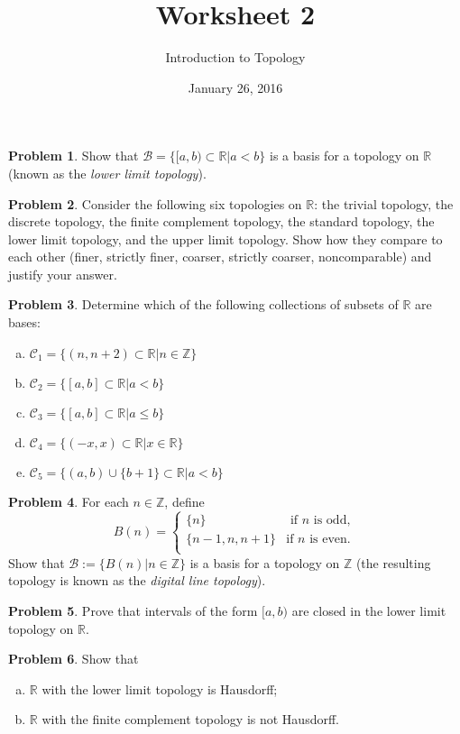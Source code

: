 \documentclass{amsart}
\newcommand{\+}[1]{\ensuremath{\mathbf{#1}}}
\newcommand{\Z}{{\mathbb Z}}
\newcommand{\R}{{\mathbb R}}
\theoremstyle{definition}
\newtheorem{prob}{Problem}
\begin{document}
\title{Worksheet 2}
\date{January 26, 2016}
\author{Introduction to Topology}

\maketitle
\begin{prob}
 Show that $\mathcal{B} = \{[a,b) \subset \R \vert a < b\}$
 is a basis for a topology on $\R$ (known as the \emph{lower limit topology}).
\end{prob}


\begin{prob}
 Consider the following six topologies on $\R$: the trivial topology, the discrete topology, the finite complement topology, the standard topology, the lower limit topology, and the upper limit topology.  Show how they compare to each other (finer, strictly finer, coarser, strictly coarser, noncomparable)
 and justify your answer.
\end{prob}



\begin{prob}
Determine which of the following collections of subsets of $\R$ are bases:
\begin{enumerate}[(a)]
 \item $\mathcal{C}_1 = \{(n, n+2) \subset \R \vert n \in \Z\}$ 
 \item $\mathcal{C}_2 = \{[a,b] \subset \R \vert a < b\}$
 \item $\mathcal{C}_3 = \{[a,b] \subset \R \vert a \leq b\}$
 \item $\mathcal{C}_4 = \{(-x,x) \subset \R \vert x \in \R\}$
 \item $\mathcal{C}_5 = \{(a,b) \cup \{b+1\} \subset \R \vert a < b\}$
\end{enumerate}
\end{prob}



\begin{prob}
 For each $n \in \Z$, define
 \begin{equation*}
  B(n) = 
  \begin{cases}
   \{n\} & \text{ if $n$ is odd},\\
   \{n-1,n,n+1\} & \text{if $n$ is even}.\\
  \end{cases}
 \end{equation*}
Show that $\mathcal{B} := \{B(n) \vert n \in \Z \}$
is a basis for a topology on $\Z$ (the resulting topology is known as the \emph{digital line topology}).
\end{prob}

\begin{prob}
 Prove that intervals of the form $[a,b)$ are closed in the lower limit topology on $\R$.
\end{prob}

\begin{prob}
 Show that
 \begin{enumerate}[(a)]
  \item $\R$ with the lower limit topology is Hausdorff;
  \item $\R$ with the finite complement topology is not Hausdorff.
 \end{enumerate}
 \end{prob}
\end{document}
